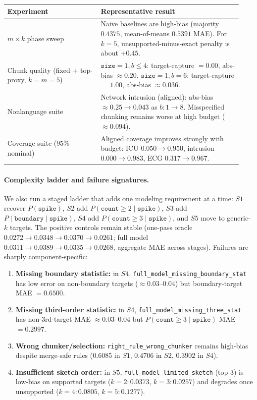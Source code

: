 \begin{center}
\begin{tabular}{p{0.37\linewidth}p{0.57\linewidth}}
\toprule
\textbf{Experiment} & \textbf{Representative result} \\
\midrule
\(m\times k\) phase sweep &
Naive baselines are high-bias (majority \(0.4375\), mean-of-means \(0.5391\) MAE).
For \(k=5\), unsupported-minus-exact penalty is about \(+0.45\). \\
\addlinespace
Chunk quality (fixed + top-proxy, \(k=m=5\)) &
\(\texttt{size}=1, b\le4\): target-capture \(=0.00\), abs-bias \(\approx0.20\).
\(\texttt{size}=1, b=6\): target-capture \(=1.00\), abs-bias \(\approx0.036\). \\
\addlinespace
Nonlanguage suite &
Network intrusion (aligned): abs-bias \(\approx0.25\to0.043\) as \(b:1\to8\).
Misspecified chunking remains worse at high budget (\(\approx0.094\)). \\
\addlinespace
Coverage suite (95\% nominal) &
Aligned coverage improves strongly with budget:
ICU \(0.050\to0.950\), intrusion \(0.000\to0.983\), ECG \(0.317\to0.967\). \\
\bottomrule
\end{tabular}
\end{center}

\paragraph{Complexity ladder and failure signatures.}
We also run a staged ladder that adds one modeling requirement at a time:
\(S1\) recover \(P(\texttt{spike})\), \(S2\) add \(P(\texttt{count}\ge2\mid\texttt{spike})\),
\(S3\) add \(P(\texttt{boundary}\mid\texttt{spike})\), \(S4\) add \(P(\texttt{count}\ge3\mid\texttt{spike})\),
and \(S5\) move to generic-\(k\) targets.
The positive controls remain stable (one-pass oracle \(0.0272\to0.0348\to0.0370\to0.0261\);
full model \(0.0311\to0.0389\to0.0335\to0.0268\), aggregate MAE across stages).
Failures are sharply component-specific:
\begin{enumerate}[nosep]
    \item \textbf{Missing boundary statistic:} in \(S4\), \texttt{full\_model\_missing\_boundary\_stat}
    has low error on non-boundary targets (\(\approx0.03\)--\(0.04\)) but boundary-target MAE \(=0.6500\).
    \item \textbf{Missing third-order statistic:} in \(S4\), \texttt{full\_model\_missing\_three\_stat}
    has non-3rd-target MAE \(\approx0.03\)--\(0.04\) but \(P(\texttt{count}\ge3\mid\texttt{spike})\) MAE \(=0.2997\).
    \item \textbf{Wrong chunker/selection:} \texttt{right\_rule\_wrong\_chunker} remains high-bias despite merge-safe rules
    (\(0.6085\) in \(S1\), \(0.4706\) in \(S2\), \(0.3902\) in \(S4\)).
    \item \textbf{Insufficient sketch order:} in \(S5\), \texttt{full\_model\_limited\_sketch} (top-3)
    is low-bias on supported targets (\(k=2:0.0373\), \(k=3:0.0257\)) and degrades once unsupported
    (\(k=4:0.0805\), \(k=5:0.1277\)).
\end{enumerate}

